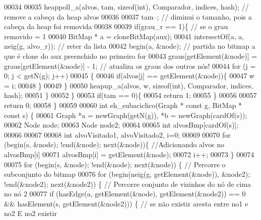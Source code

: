 \begin{DoxyCode}
00034 
00035         heappoll_a(alvos, tam, \textcolor{keyword}{sizeof}(\textcolor{keywordtype}{int}), Comparador, indices, hash); \textcolor{comment}{// remove a cabeça da heap alvos}
00036 
00037         tam--; \textcolor{comment}{// diminui o tamanho, pois a cabeça da heap foi removida}
00038 
00039         \textcolor{keywordflow}{if}(grau\_r == 1)\{ \textcolor{comment}{// se o grau removido = 1}
00040             BitMap * a = cloneBitMap(aux); 
00041             intersectOf(a, a, neig(g, alvo\_r)); \textcolor{comment}{// reter da lista}
00042             begin(a, &node); \textcolor{comment}{// partida no bitmap a que é clone do aux preenchido no primeiro for}
00043             graus[getElement(&node)] = graus[getElement(&node)] - 1; \textcolor{comment}{// atualiza os graus dos outros nós!}
00044             \textcolor{keywordflow}{for} (j = 0; j < getN(g); j++)
00045             \{
00046                 \textcolor{keywordflow}{if}(alvos[j] == getElement(&node))\{
00047                     w = i;
00048                 \}
00049             \}
00050             heapup_a(alvos, w, \textcolor{keyword}{sizeof}(\textcolor{keywordtype}{int}), Comparador, indices, hash);
00051         \}
00052     \}
00053     \textcolor{keywordflow}{if}(tam == 0)\{
00054         \textcolor{keywordflow}{return} 1;
00055     \}
00056 
00057     \textcolor{keywordflow}{return} 0;
00058 \}
00059 
00060 \textcolor{keywordtype}{int} eh_subaciclico(Graph * \textcolor{keyword}{const} g, BitMap * \textcolor{keyword}{const} s) \{
00061     Graph *a = newGraph(getN(g)), *b = newGraph(cardOf(s));
00062     Node node;
00063     Node node2;
00064 
00065     \textcolor{keywordtype}{int} alvosBmp[cardOf(s)];
00066     
00067     
00068     \textcolor{keywordtype}{int} alvoVisitado1, alvoVisitado2, i=0;
00069 
00070     \textcolor{keywordflow}{for} (begin(s, &node); !end(&node); next(&node))\{ \textcolor{comment}{//Adicionando alvos no alvosBmp[i]}
00071         alvosBmp[i] = getElement(&node);
00072         i++;
00073     \}
00074 
00075     \textcolor{keywordflow}{for} (begin(s, &node); !end(&node); next(&node)) \{ \textcolor{comment}{// Percorre o subconjunto do bitmap}
00076         \textcolor{keywordflow}{for} (begin(neig(g, getElement(&node)), &node2); !end(&node2); next(&node2)) \{ \textcolor{comment}{// Percorre conjunto
       de vizinhos do nó de cima no nó 2}
00077             \textcolor{keywordflow}{if} (hasEdge(a, getElement(&node), getElement(&node2)) == 0 && 
      hasElement(s, getElement(&node2))) \{ \textcolor{comment}{// se não existir aresta entre no1 e no2 E no2 existir}

\end{DoxyCode}
